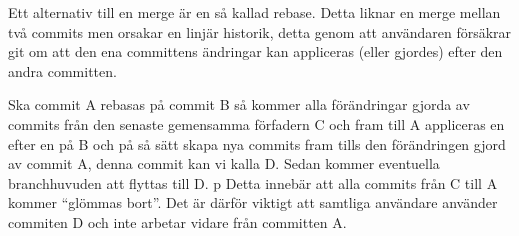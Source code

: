 \documentclass[a4paper,12pt]{article}
\begin{document}
Ett alternativ till en merge är en så kallad rebase.
Detta liknar en merge mellan två commits men orsakar en linjär historik, detta genom att användaren försäkrar git om att den ena committens ändringar kan appliceras (eller gjordes) efter den andra committen.

Ska commit A rebasas på commit B så kommer alla förändringar gjorda av commits från den senaste gemensamma förfadern C och fram till A appliceras en efter en på B och på så sätt skapa nya commits fram tills den förändringen gjord av commit A, denna commit kan vi kalla D.
Sedan kommer eventuella branchhuvuden att flyttas till D.
p
Detta innebär att alla commits från C till A kommer ``glömmas bort''. 
Det är därför viktigt att samtliga användare använder commiten D och inte arbetar vidare från committen A.
\end{document}

